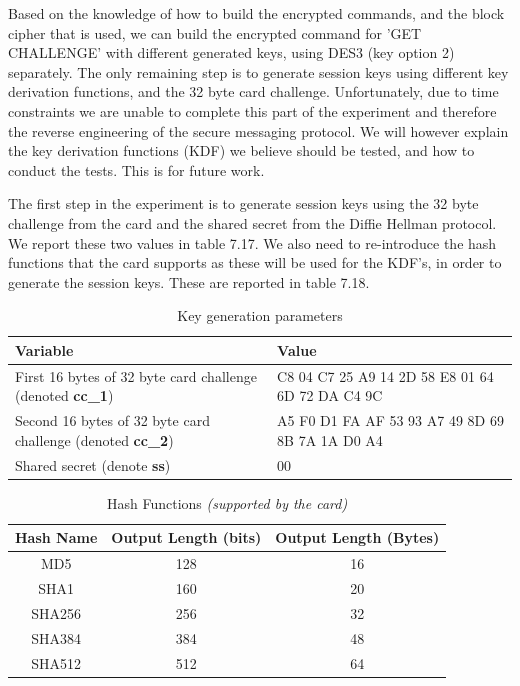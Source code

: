\documentclass[bsc,frontabs,twoside,singlespacing,parskip,deptreport]{infthesis}     %
\begin{document}
Based on the knowledge of how to build the encrypted commands, and the block cipher that is used, we can build the encrypted command for 'GET CHALLENGE' with different generated keys, using DES3 (key option 2) separately. The only remaining step is to generate session keys using different key derivation functions, and the 32 byte card challenge. Unfortunately, due to time constraints we are unable to complete this part of the experiment and therefore the reverse engineering of the secure messaging protocol. We will however explain the key derivation functions (KDF) we believe should be tested, and how to conduct the tests. This is for future work.

The first step in the experiment is to generate session keys using the 32 byte challenge from the card and the shared secret from the Diffie Hellman protocol. We report these two values in table 7.17. We also need to re-introduce the hash functions that the card supports as these will be used for the KDF's, in order to generate the session keys. These are reported in table 7.18.

\begin{table}[H]
\begin{tabular}{|p{4cm}|p{10cm}|}
\hline
\textbf{Variable} & \textbf{Value}\\
\hline
First 16 bytes of 32 byte card challenge (denoted \textbf{cc\_1}) & C8 04 C7 25 A9 14 2D 58 E8 01 64 6D 72 DA C4 9C\\
\hline
Second 16 bytes of 32 byte card challenge (denoted \textbf{cc\_2}) & A5 F0 D1 FA AF 53 93 A7 49 8D 69 8B 7A 1A D0 A4\\
\hline
Shared secret (denote \textbf{ss}) & 00\\
\hline
\end{tabular}
\caption{Key generation parameters}
\end{table}

\begin{table}[H]
\begin{center}
\begin{tabular}{|c|c|c|}
\hline
Hash Name & Output Length (bits) & Output Length (Bytes)\\
\hline

MD5 & 128 &16\\
SHA1 & 160 & 20\\
SHA256 & 256 & 32\\
SHA384 & 384 & 48\\
SHA512 & 512 & 64\\
\hline
\end{tabular}
\caption{Hash Functions \textit{(supported by the card)}}
\end{center}
\end{table}
\end{document}
